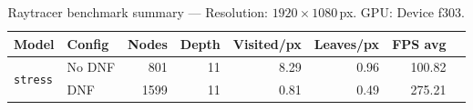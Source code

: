 
\begin{table}[htbp]
  \centering\small
  \setlength{\tabcolsep}{4pt}
  \caption{Raytracer benchmark summary --- Resolution: $1920\times1080$\,px. GPU: Device f303.}
  \label{tab:rt-summary}
  \begin{tabular}{@{}llrrrrrr@{}}
    \toprule
    \textbf{Model} & \textbf{Config} & \textbf{Nodes} & \textbf{Depth} & \textbf{Visited/px} & \textbf{Leaves/px} & \textbf{FPS avg} \\
    \midrule
    \multirow{2}{*}{\texttt{stress}} & No DNF & 801 & 11 & 8.29 & 0.96 & 100.82 \\
     & DNF & 1599 & 11 & 0.81 & 0.49 & 275.21 \\
    \bottomrule
  \end{tabular}
\end{table}
